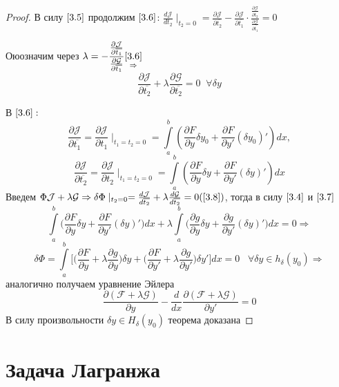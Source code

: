 \documentclass{article}
\begin{document}
\begin{proof}
В силу $\ref{3.5}$ продолжим $\ref{3.6}$: $\frac{d\mathcal{J}}{d t_2}\mid_{t_2=0}=\frac{\partial \mathcal{J}}{\partial \overline{t_2}}-\frac{\partial \mathcal{J}}{\partial \overline{t_1}}\cdot \frac{\frac{\partial \mathcal{G}}{\partial \overline{t_2}}}{\frac{\partial \mathcal{G}}{\partial \overline{t_1}}}=0$
\par
Оюозначим через $\lambda = -\dfrac{\frac{\partial\mathcal{J}}{\partial \overline{t_1}}}{\frac{\partial\mathcal{G}}{\partial \overline{t_1}}}\underset{\Rightarrow}{\ref{3.6}}$
\begin{equation}
\label{3.8}
\tag{3.8}
\frac{\partial\mathcal{J}}{\partial\overline{t_2}}+\lambda \frac{\partial\mathcal{G}}{\partial\overline{t_2}}=0\;\;\forall\delta y \end{equation}
\par
В $\ref{3.6}:$
\begin{equation}
    \label{3.7}
    \tag{3.7}
    \frac{\partial\mathcal{J}}{\partial \overline{t_1}}=\frac{\partial \mathcal{J}}{\partial t_1}\mid_{t_1=t_2=0}=\int\limits_a^b(\frac{\partial F}{\partial y}\delta y_0+\frac{\partial F}{\partial y'}(\delta y_0)')d x,
    \end{equation}
    \begin{equation*}
    \frac{\partial\mathcal{J}}{\partial \overline{t_2}}=\frac{\partial \mathcal{J}}{\partial t_2}\mid_{t_1=t_2=0}=\int\limits_a^b(\frac{\partial F}{\partial y}\delta y+\frac{\partial F}{\partial y'}(\delta y)')d x
\end{equation*}
Введем $\Phi \mathcal{J}+\lambda\mathcal{G}\Rightarrow \delta \Phi\mid_{t_2=0}=\frac{d\mathcal{J}}{d\overline{t_2}}+\lambda\frac{d\mathcal{G}}{d\overline{t_2}}=0(\ref{3.8})$, тогда в силу $\ref{3.4}$ и $\ref{3.7}$ $$\int\limits_a^b\Big(\frac{\partial F}{\partial y}\delta y + \frac{\partial F}{\partial y'}(\delta y)'\Big)d x+\lambda\int\limits_a^b\Big(\frac{\partial g}{\partial y}\delta y + \frac{\partial g}{\partial y'}(\delta y)'\Big)d x=0\Rightarrow$$$$ \delta \Phi =\int\limits_a^b\Big[\Big(\frac{\partial F}{\partial y}+ \lambda\frac{\partial g}{\partial y}\Big)\delta y + \Big(\frac{\partial F}{\partial y'}+ \lambda\frac{\partial g}{\partial y'}\Big)\delta y'\Big]dx=0\;\;\;\forall \delta y \in h_\delta(y_0)\Rightarrow$$
аналогично получаем уравнение Эйлера
$$\frac{\partial(\mathcal{F}+\lambda\mathcal{G})}{\partial y}-\frac{d}{dx}\frac{\partial(\mathcal{F}+\lambda\mathcal{G})}{\partial y'}=0$$
В силу произвольности $\delta y\in H_\delta(y_0)$ теорема доказана
\end{proof}
\section{Задача Лагранжа}\par
\end{document}

